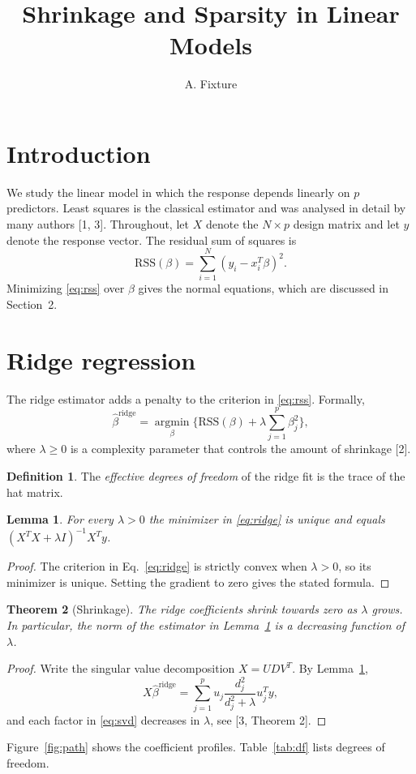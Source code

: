 \documentclass[11pt]{article}
\newtheorem{theorem}{Theorem}
\newtheorem{lemma}[theorem]{Lemma}
\theoremstyle{definition}
\newtheorem{definition}{Definition}
\begin{document}
\title{Shrinkage and Sparsity in Linear Models}
\author{A. Fixture}
\date{}
\maketitle

\section{Introduction}
We study the linear model in which the response depends linearly on $p$ predictors.
Least squares is the classical estimator and was analysed in detail by many authors [1, 3].
Throughout, let $X$ denote the $N \times p$ design matrix and let $y$ denote the response vector.
The residual sum of squares is
\begin{equation}
\mathrm{RSS}(\beta) = \sum_{i=1}^{N} (y_i - x_i^T \beta)^2 .
\label{eq:rss}
\end{equation}
Minimizing \eqref{eq:rss} over $\beta$ gives the normal equations, which are discussed in Section~2.

\section{Ridge regression}
The ridge estimator adds a penalty to the criterion in \eqref{eq:rss}. Formally,
\begin{equation}
\hat\beta^{\mathrm{ridge}} = \operatorname*{argmin}_{\beta} \Big\{ \mathrm{RSS}(\beta) + \lambda \sum_{j=1}^{p} \beta_j^2 \Big\},
\label{eq:ridge}
\end{equation}
where $\lambda \ge 0$ is a complexity parameter that controls the amount of shrinkage [2].
\begin{definition}
The \emph{effective degrees of freedom} of the ridge fit is the trace of the hat matrix.
\end{definition}
\begin{lemma}\label{lem:solution}
For every $\lambda > 0$ the minimizer in \eqref{eq:ridge} is unique and equals $(X^TX + \lambda I)^{-1} X^T y$.
\end{lemma}
\begin{proof}
The criterion in Eq.~\eqref{eq:ridge} is strictly convex when $\lambda > 0$, so its minimizer is unique.
Setting the gradient to zero gives the stated formula.
\end{proof}
\begin{theorem}[Shrinkage]\label{thm:shrink}
The ridge coefficients shrink towards zero as $\lambda$ grows. In particular, the norm of the estimator in Lemma~\ref{lem:solution} is a decreasing function of $\lambda$.
\end{theorem}
\begin{proof}
Write the singular value decomposition $X = UDV^T$. By Lemma~\ref{lem:solution},
\begin{equation}
X\hat\beta^{\mathrm{ridge}} = \sum_{j=1}^{p} u_j \frac{d_j^2}{d_j^2 + \lambda} u_j^T y ,
\label{eq:svd}
\end{equation}
and each factor in \eqref{eq:svd} decreases in $\lambda$, see [3, Theorem 2].
\end{proof}
Figure~\ref{fig:path} shows the coefficient profiles. Table~\ref{tab:df} lists degrees of freedom.
\end{document}
